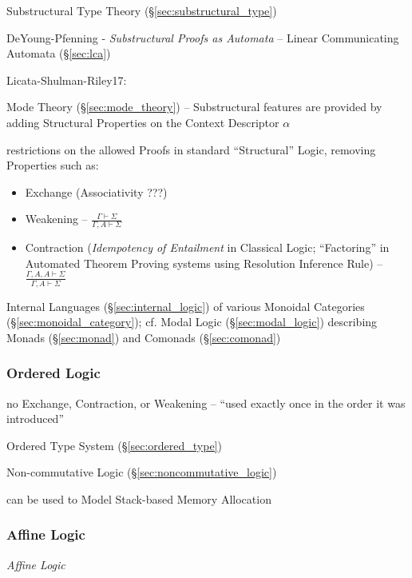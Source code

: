 Substructural Type Theory (\S\ref{sec:substructural_type})

DeYoung-Pfenning - \emph{Substructural Proofs as Automata}
-- Linear Communicating Automata (\S\ref{sec:lca})

Licata-Shulman-Riley17:

\fist Mode Theory (\S\ref{sec:mode_theory}) -- Substructural features
are provided by adding Structural Properties on the Context Descriptor
$\alpha$

restrictions on the allowed Proofs in standard ``Structural'' Logic,
removing Properties such as:
\begin{itemize}
  \item Exchange (Associativity ???) %
  \item Weakening -- $\frac{\Gamma \vdash \Sigma}
    {\Gamma,A \vdash \Sigma}$
  \item Contraction (\emph{Idempotency of Entailment} in Classical
    Logic; ``Factoring'' in Automated Theorem Proving systems using
    Resolution Inference Rule) -- $\frac{\Gamma,A,A \vdash \Sigma}
    {\Gamma,A \vdash \Sigma}$
\end{itemize}

Internal Languages (\S\ref{sec:internal_logic}) of various Monoidal
Categories (\S\ref{sec:monoidal_category}); cf. Modal Logic
(\S\ref{sec:modal_logic}) describing Monads (\S\ref{sec:monad}) and
Comonads (\S\ref{sec:comonad})



\subsubsection{Ordered Logic}\label{sec:ordered_logic}\hfill

no Exchange, Contraction, or Weakening -- ``used exactly once in the
order it was introduced''

\fist Ordered Type System (\S\ref{sec:ordered_type})

\fist Non-commutative Logic (\S\ref{sec:noncommutative_logic})

can be used to Model Stack-based Memory Allocation



\subsubsection{Affine Logic}\label{sec:affine_logic}

\emph{Affine Logic}

